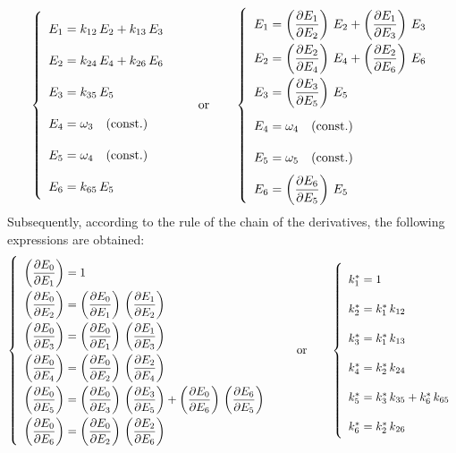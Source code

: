 \documentclass[energies,article,submit,moreauthors,pdftex]{Definitions/mdpi}
\newcommand{\dpartial}[2]{\left(\dfrac{\partial E_{#1}}{\partial E_{#2}}\right)}
\begin{document}
\begin{equation}
    \def\arraystretch{2.1}
    \left\{\begin{array}{l}
        E_1=k_{12}\,E_2 + k_{13}\,E_3 \\
        E_2=k_{24}\,E_4 + k_{26}\,E_6 \\
        E_3=k_{35}\,E_5\\
        E_4=\omega_3 \quad \text{(const.)}\\
        E_5=\omega_4 \quad \text{(const.)}\\
        E_6=k_{65}\,E_5
    \end{array}\right.
    \qquad
    \text{or}
    \qquad
    \left\{\begin{array}{l}
        E_1=\dpartial{1}{2}\,E_2 + \dpartial{1}{3}\,E_3 \\
        E_2=\dpartial{2}{4}\,E_4 + \dpartial{2}{6}\,E_6 \\
        E_3=\dpartial{3}{5}\,E_5\\
        E_4=\omega_4 \quad \text{(const.)}\\
        E_5=\omega_5 \quad \text{(const.)}\\
        E_6=\dpartial{6}{5}\,E_5
    \end{array}\right.
    \label{eq:egenplant}
\end{equation}
Subsequently, according to the rule of the chain of the derivatives, the following expressions are obtained:
\begin{equation}
    \def\arraystretch{2.1}
    \left\{\begin{array}{l}
       \dpartial{0}{1}=1 \\
       \dpartial{0}{2}=\dpartial{0}{1}\,\dpartial{1}{2} \\
       \dpartial{0}{3}=\dpartial{0}{1}\,\dpartial{1}{3} \\
       \dpartial{0}{4}=\dpartial{0}{2}\,\dpartial{2}{4} \\
       \dpartial{0}{5}=\dpartial{0}{3}\,\dpartial{3}{5} + \dpartial{0}{6}\,\dpartial{6}{5} \\
       \dpartial{0}{6}=\dpartial{0}{2}\,\dpartial{2}{6} \\
    \end{array}\right.
    \qquad
    \text{or}
    \qquad
       \left\{\begin{array}{l}
        k_1^* = 1 \\
        k_2^* = k_1^*\,k_{12} \\
        k_3^* = k_1^*\,k_{13} \\
        k_4^* = k_2^*\,k_{24} \\
        k_5^* = k_3^*\,k_{35} + k_6^*\,k_{65} \\
        k_6^* = k_2^*\,k_{26} \\
    \end{array}\right.
    \label{eq:kgenplant}
\end{equation}
\end{document}
